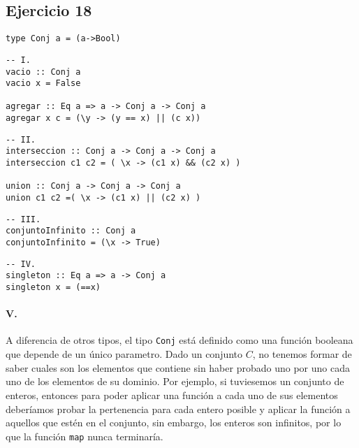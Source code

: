 \documentclass[10pt,a4paper]{article}
\begin{document}
\subsection{Ejercicio 18}
\begin{centrado}
    \begin{verbatim}
type Conj a = (a->Bool)
    \end{verbatim}
\end{centrado}

\begin{centrado}
    \begin{verbatim}
-- I.
vacio :: Conj a
vacio x = False

agregar :: Eq a => a -> Conj a -> Conj a
agregar x c = (\y -> (y == x) || (c x))
    \end{verbatim}
\end{centrado}

\begin{centrado}
    \begin{verbatim}
-- II.
interseccion :: Conj a -> Conj a -> Conj a
interseccion c1 c2 = ( \x -> (c1 x) && (c2 x) )

union :: Conj a -> Conj a -> Conj a
union c1 c2 =( \x -> (c1 x) || (c2 x) )
 \end{verbatim}
\end{centrado}

\begin{centrado}
    \begin{verbatim}
-- III.
conjuntoInfinito :: Conj a
conjuntoInfinito = (\x -> True)
    \end{verbatim}
\end{centrado}

\begin{centrado}
    \begin{verbatim}
-- IV.
singleton :: Eq a => a -> Conj a
singleton x = (==x)
    \end{verbatim}
\end{centrado}

\paragraph{V.} A diferencia de otros tipos, el tipo \texttt{Conj} está definido como una función booleana que depende de un único parametro. Dado un conjunto $C$, no tenemos formar de saber cuales son los elementos que contiene sin haber probado uno por uno cada uno de los elementos de su dominio. Por ejemplo, si tuviesemos un conjunto de enteros, entonces para poder aplicar una función a cada uno de sus elementos deberíamos probar la pertenencia para cada entero posible y aplicar la función a aquellos que estén en el conjunto, sin embargo, los enteros son infinitos, por lo que la función \texttt{map} nunca terminaría.
\end{document}
